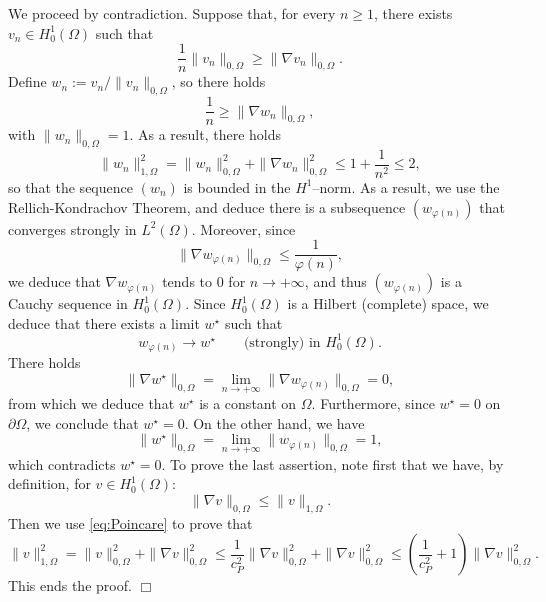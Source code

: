 \documentclass{article}
\begin{document}
 We proceed by contradiction. Suppose that, for every $n \geq 1$, there exists $v_n \in H^1_0(\Omega)$ such that
\[
    \frac{1}{n} \| v_n \|_{0,\Omega} \geq
    \| \nabla v_n \|_{0,\Omega}.
\]
Define $w_n := v_n / \| v_n \|_{0,\Omega}$, so there holds
\[
    \frac{1}{n} \geq  \| \nabla w_n \|_{0,\Omega},
\]
with $\| w_n \|_{0,\Omega} = 1$.
%
As a result, there holds
\[
\| w_n \|^2_{1,\Omega}
=
\| w_n \|^2_{0,\Omega} + \| \nabla w_n \|^2_{0,\Omega} \leq 1 + \frac1{n^2} \leq 2,
\]
so that the sequence $(w_n)$ is bounded in the $H^1$--norm. As a result, we use the Rellich-Kondrachov Theorem, and deduce there is a subsequence $(w_{\varphi(n)})$ that converges strongly in $L^2(\Omega)$. Moreover, since 
\[
\| \nabla w_{\varphi(n)} \|_{0,\Omega} \leq \frac{1}{\varphi(n)},
\]
we deduce that $\nabla w_{\varphi(n)}$ tends to $0$ for $n\rightarrow+\infty$, and thus $(w_{\varphi(n)})$ is a Cauchy sequence in $H^1_0(\Omega)$. Since $H^1_0(\Omega)$ is a Hilbert (complete) space, we deduce that there exists a limit $w^\star$ such that
\[
w_{\varphi(n)} \rightarrow w^\star \qquad \textrm{(strongly) in } H^1_0(\Omega).
\]
There holds
\[
\| \nabla w^\star \|_{0,\Omega}
=
\lim_{n\rightarrow +\infty} 
\| \nabla w_{\varphi(n)} \|_{0,\Omega} = 0,
\]
from which we deduce that $w^\star$ is a constant on $\Omega$.
Furthermore, since $w^\star = 0$ on $\partial \Omega$, we conclude that $w^\star = 0$.
On the other hand, we have
\[
\| w^\star \|_{0,\Omega}
=
\lim_{n\rightarrow +\infty} 
\| w_{\varphi(n)} \|_{0,\Omega} = 1,
\]
which contradicts $w^\star=0$. 
To prove the last assertion, note first that we have, by definition, for $v\in H^1_0(\Omega)$:
\[
\| \nabla v \|_{0,\Omega} \leq
\| v \|_{1,\Omega}.
\]
Then we use \eqref{eq:Poincare} to prove that
\[
\| v \|^2_{1,\Omega}
= 
\| v \|^2_{0,\Omega} + \| \nabla v \|^2_{0,\Omega}
\leq \frac{1}{c_P^2} \| \nabla v \|^2_{0,\Omega}
+ \| \nabla v \|^2_{0,\Omega} \leq
\left ( 
\frac{1}{c_P^2} + 1 
\right ) \| \nabla v \|^2_{0,\Omega}.
\]
This ends the proof.
$\Box$

\medskip
\end{document}
